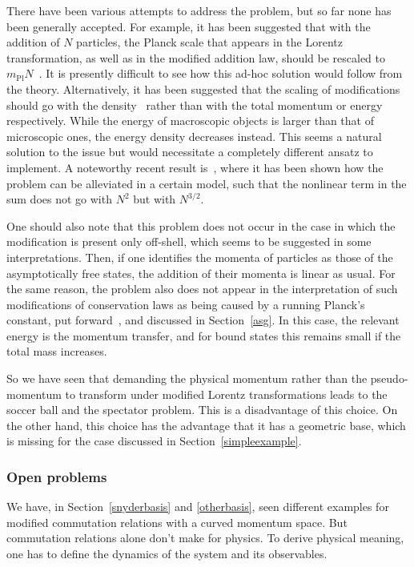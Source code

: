 \documentclass{article}
\begin{document}
There have been various attempts to address the problem, but so far none has been
generally accepted. For example, it has been suggested that with the addition of $N$ particles,
the Planck scale that appears in the Lorentz transformation, as well as in the modified
addition law, should be rescaled to $m_{\mathrm{Pl}} N$~\cite{Magueijo:2002am,Judes:2002bw,Magueijo:2006qd}. 
It is presently difficult to see how this ad-hoc solution would follow from the theory. Alternatively, it has been suggested
that the scaling of modifications should go with the density~\cite{Hossenfelder:2007fy,Olmo:2011sw} rather than with
the total momentum or energy respectively. While the energy of macroscopic objects is larger
than that of microscopic ones, the energy density decreases instead. This seems
a natural solution to the issue but would necessitate a completely different ansatz
to implement. A noteworthy recent result is~\cite{AmelinoCamelia:2011uk,Hossenfelder:2012vk}, where it has
been shown how the problem can be alleviated in a certain model, such that the nonlinear term
in the sum does not go with $N^2$ but with $N^{3/2}$. 

One should also note that this problem does not occur in the case in which the modification 
is present only off-shell, which seems to be suggested in some interpretations. Then, if one
identifies the momenta of particles as those of the asymptotically free states, the 
addition of their momenta is linear as usual. For the same reason, the problem also does not
appear in the interpretation of such modifications of conservation laws as being caused by a 
running Planck's constant, put forward~\cite{Percacci:2010af,Calmet:2010tx}, and discussed in Section~\ref{asg}. 
In this case, the relevant energy is the momentum transfer, and for bound states this remains small 
if the total mass increases.

So we have seen that demanding the physical momentum
rather than the pseudo-momentum to transform under modified Lorentz transformations leads to
the soccer ball and the spectator problem. This is a disadvantage of this choice. On the other
hand, this choice has the advantage that it has a geometric base,
which is missing for the case discussed in Section~\ref{simpleexample}.  

\subsubsection{Open problems}

We have, in Section~\ref{snyderbasis} and \ref{otherbasis},
seen different examples for modified commutation relations with
a curved momentum space. But
commutation relations alone don't make for physics. To derive physical meaning, one has to 
define the dynamics of the system and its observables. 
\end{document}
